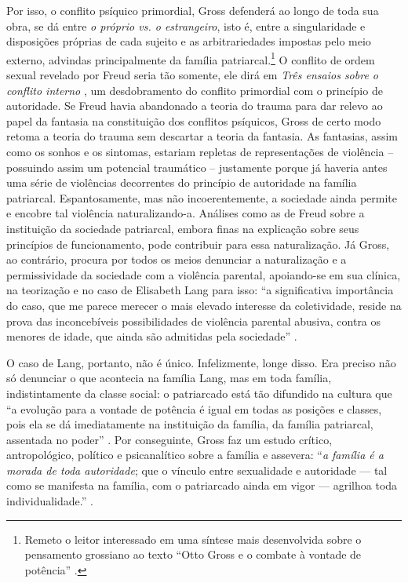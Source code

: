 Por isso, o conflito psíquico primordial, Gross defenderá ao longo de
toda sua obra, se dá entre \emph{o próprio vs. o estrangeiro}, isto é,
entre a singularidade e disposições próprias de cada sujeito e as
arbitrariedades impostas pelo meio externo, advindas principalmente da
família patriarcal.\footnote{Remeto o leitor interessado em uma síntese
  mais desenvolvida sobre o pensamento grossiano ao texto ``Otto Gross e
  o combate à vontade de potência'' .} O conflito de ordem sexual
revelado por Freud seria tão somente, ele dirá em \emph{Três ensaios
sobre o conflito interno} , um desdobramento do conflito primordial com
o princípio de autoridade. Se Freud havia abandonado a teoria do trauma
para dar relevo ao papel da fantasia na constituição dos conflitos
psíquicos, Gross de certo modo retoma a teoria do trauma sem descartar a
teoria da fantasia. As fantasias, assim como os sonhos e os sintomas,
estariam repletas de representações de violência -- possuindo assim um
potencial traumático -- justamente porque já haveria antes uma série de
violências decorrentes do princípio de autoridade na família patriarcal.
Espantosamente, mas não incoerentemente, a sociedade ainda permite e
encobre tal violência naturalizando-a. Análises como as de Freud sobre a
instituição da sociedade patriarcal, embora finas na explicação sobre
seus princípios de funcionamento, pode contribuir para essa
naturalização. Já Gross, ao contrário, procura por todos os meios
denunciar a naturalização e a permissividade da sociedade com a
violência parental, apoiando-se em sua clínica, na teorização e no caso
de Elisabeth Lang para isso: ``a significativa importância do caso, que
me parece merecer o mais elevado interesse da coletividade, reside na
prova das inconcebíveis possibilidades de violência parental abusiva,
contra os menores de idade, que ainda são admitidas pela sociedade'' .

O caso de Lang, portanto, não é único. Infelizmente, longe disso. Era
preciso não só denunciar o que acontecia na família Lang, mas em toda
família, indistintamente da classe social: o patriarcado está tão
difundido na cultura que ``a evolução para a vontade de potência é igual
em todas as posições e classes, pois ela se dá imediatamente na
instituição da família, da família patriarcal, assentada no poder'' .
Por conseguinte, Gross faz um estudo crítico, antropológico, político e
psicanalítico sobre a família e assevera: ``\emph{a família é a morada
de toda autoridade}; que o vínculo entre sexualidade e autoridade ---
tal como se manifesta na família, com o patriarcado ainda em vigor ---
agrilhoa toda individualidade.'' .

